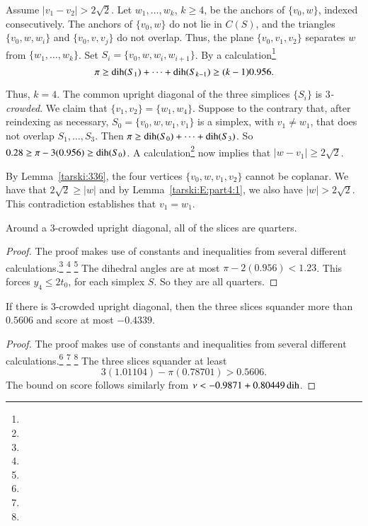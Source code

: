 Assume  $|v_1-v_2|>2\sqrt{2}$. Let $w_1,\ldots,w_k$, $k\ge4$, be the
anchors of $\{v_0,w\}$, indexed consecutively. The anchors of $\{v_0,w\}$ do not
lie in $C(S)$, and the triangles $\{v_0,w,w_i\}$ and $\{v_0,v,v_j\}$ do not
overlap. Thus, the plane $\{v_0,v_1,v_2\}$ separates $w$ from
$\{w_1,\ldots,w_k\}$. Set $S_i=\{v_0,w,w_i,w_{i+1}\}$.
By a calculation\footnote{} %
    $$\pi\ge \operatorname{dih}(S_1)+\cdots+\operatorname{dih}(S_{k-1})\ge (k-1)0.956.$$

Thus, $k=4$. The common upright diagonal  of the three simplices
$\{S_i\}$ is {\it $3$-crowded}.  We claim that
$\{v_1,v_2\}=\{w_1,w_4\}$. Suppose to the contrary that, after
reindexing as necessary, $S_0=\{v_0,w,w_1,v_1\}$ is a simplex, with
$v_1\ne w_1$, that does not overlap $S_1,\ldots,S_3$. Then $\pi\ge
\operatorname{dih}(S_0)+\cdots+\operatorname{dih}(S_3)$. So
    $0.28\ge \pi-3(0.956)\ge \operatorname{dih}(S_0)$.
A calculation\footnote{} %
now implies that $|w-v_1|\ge 2\sqrt{2}$.

By Lemma~\ref{tarski:336}, the four vertices
$\{v_0,w,v_1,v_2\}$ cannot be coplanar.
We have that $2\sqrt{2}\ge|w|$ and by Lemma~\ref{tarski:E:part4:1},
we also have $|w|>2\sqrt2$.
This contradiction establishes that $v_1=w_1$.

\begin{lemma}
Around a $3$-crowded upright diagonal, all of the slices
are quarters.
\end{lemma}

\begin{proof}  The proof makes use of constants and inequalities from
several different calculations.\footnote{} %
\footnote{} %
\footnote{} %
The dihedral angles are at most $\pi-
2(0.956) < 1.23$. This forces $y_4\le 2t_0$, for each simplex $S$.
So they are all quarters.
\end{proof}

\begin{lemma}
    \label{lemma:3-crowded}
If there is $3$-crowded upright diagonal, then the three 
slices squander more than $0.5606$ and score at most $-0.4339$.
\end{lemma}


\begin{proof}  The proof makes use of constants and inequalities from
several different calculations.\footnote{} %
\footnote{} %
\footnote{} %
The three slices squander at
least
    $$
    3 (1.01104) - \pi (0.78701) > 0.5606.
    $$
The bound on score follows similarly from $\nu<-0.9871+0.80449\operatorname{dih}$.
\end{proof}

